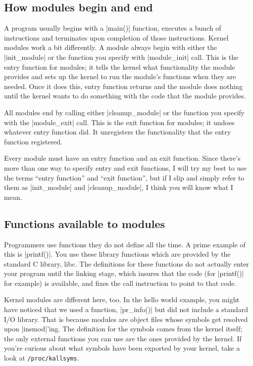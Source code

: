 \documentclass[10pt, oneside]{book}
\begin{document}
\subsection{How modules begin and end}
\label{sec:module_init_exit}
A program usually begins with a \cpp|main()| function, executes a bunch of instructions and terminates upon completion of those instructions.
Kernel modules work a bit differently. A module always begin with either the \cpp|init_module| or the function you specify with \cpp|module_init| call.
This is the entry function for modules; it tells the kernel what functionality the module provides and sets up the kernel to run the module's functions when they are needed.
Once it does this, entry function returns and the module does nothing until the kernel wants to do something with the code that the module provides.

All modules end by calling either \cpp|cleanup_module| or the function you specify with the \cpp|module_exit| call.
This is the exit function for modules; it undoes whatever entry function did.
It unregisters the functionality that the entry function registered.

Every module must have an entry function and an exit function.
Since there's more than one way to specify entry and exit functions, I will try my best to use the terms ``entry function'' and ``exit function'', but if I slip and simply refer to them as \cpp|init_module| and \cpp|cleanup_module|, I think you will know what I mean.

\subsection{Functions available to modules}
\label{sec:avail_func}
Programmers use functions they do not define all the time.
A prime example of this is \cpp|printf()|.
You use these library functions which are provided by the standard C library, libc.
The definitions for these functions do not actually enter your program until the linking stage, which insures that the code (for \cpp|printf()| for example) is available, and fixes the call instruction to point to that code.

Kernel modules are different here, too. In the hello world example, you might have noticed that we used a function, \cpp|pr_info()| but did not include a standard I/O library.
That is because modules are object files whose symbols get resolved upon \sh|insmod|'ing.
The definition for the symbols comes from the kernel itself; the only external functions you can use are the ones provided by the kernel.
If you're curious about what symbols have been exported by your kernel, take a look at \verb|/proc/kallsyms|.
\end{document}
